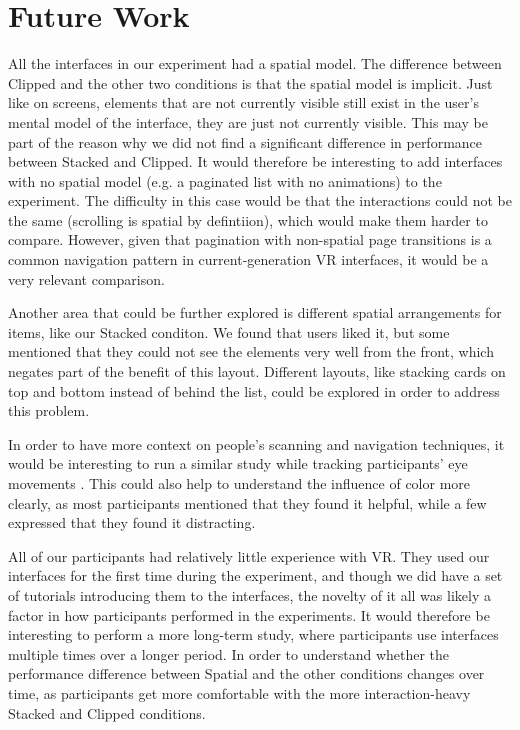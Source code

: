 \documentclass[nobib]{tufte-book} %
\begin{document}
\section{Future Work}
All the interfaces in our experiment had a spatial model. The difference between Clipped and the other two conditions is that the spatial model is implicit. Just like on screens, elements that are not currently visible still exist in the user's mental model of the interface, they are just not currently visible. This may be part of the reason why we did not find a significant difference in performance between Stacked and Clipped. It would therefore be interesting to add interfaces with no spatial model (e.g. a paginated list with no animations) to the experiment. The difficulty in this case would be that the interactions could not be the same (scrolling is spatial by defintiion), which would make them harder to compare. However, given that pagination with non-spatial page transitions is a common navigation pattern in current-generation VR interfaces, it would be a very relevant comparison.

Another area that could be further explored is different spatial arrangements for items, like our Stacked conditon. We found that users liked it, but some mentioned that they could not see the elements very well from the front, which negates part of the benefit of this layout. Different layouts, like stacking cards on top and bottom instead of behind the list, could be explored in order to address this problem.

In order to have more context on people's scanning and navigation techniques, it would be interesting to run a similar study while tracking participants' eye movements \cite{card1984visual}. This could also help to understand the influence of color more clearly, as most participants mentioned that they found it helpful, while a few expressed that they found it distracting.

All of our participants had relatively little experience with VR. They used our interfaces for the first time during the experiment, and though we did have a set of tutorials introducing them to the interfaces, the novelty of it all was likely a factor in how participants performed in the experiments. It would therefore be interesting to perform a more long-term study, where participants use interfaces multiple times over a longer period. In order to understand whether the performance difference between Spatial and the other conditions changes over time, as participants get more comfortable with the more interaction-heavy Stacked and Clipped conditions.
\end{document}
